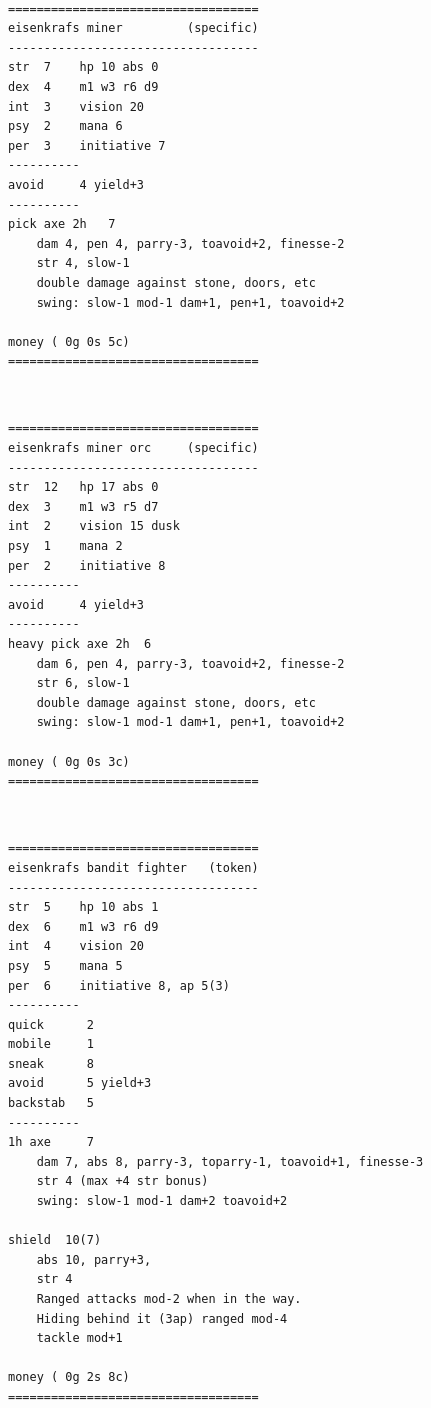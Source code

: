 \documentclass[11pt, twoside, titlepage, a4paper]{report}
\begin{document}
\

\goodbreak \begin{samepage} \small \begin{verbatim}
===================================
eisenkrafs miner         (specific)
-----------------------------------
str  7    hp 10 abs 0
dex  4    m1 w3 r6 d9
int  3    vision 20
psy  2    mana 6
per  3    initiative 7
----------
avoid     4 yield+3
----------
pick axe 2h   7
    dam 4, pen 4, parry-3, toavoid+2, finesse-2
    str 4, slow-1
    double damage against stone, doors, etc
    swing: slow-1 mod-1 dam+1, pen+1, toavoid+2

money ( 0g 0s 5c)
===================================
\end{verbatim} \normalsize \end{samepage}

\

\goodbreak \begin{samepage} \small \begin{verbatim}
===================================
eisenkrafs miner orc     (specific)
-----------------------------------
str  12   hp 17 abs 0
dex  3    m1 w3 r5 d7
int  2    vision 15 dusk
psy  1    mana 2
per  2    initiative 8
----------
avoid     4 yield+3
----------
heavy pick axe 2h  6
    dam 6, pen 4, parry-3, toavoid+2, finesse-2
    str 6, slow-1
    double damage against stone, doors, etc
    swing: slow-1 mod-1 dam+1, pen+1, toavoid+2

money ( 0g 0s 3c)
===================================
\end{verbatim} \normalsize \end{samepage}

\

\goodbreak \begin{samepage} \small \begin{verbatim}
===================================
eisenkrafs bandit fighter   (token)
-----------------------------------
str  5    hp 10 abs 1
dex  6    m1 w3 r6 d9
int  4    vision 20
psy  5    mana 5
per  6    initiative 8, ap 5(3)
----------
quick      2
mobile     1
sneak      8
avoid      5 yield+3
backstab   5
----------
1h axe     7
    dam 7, abs 8, parry-3, toparry-1, toavoid+1, finesse-3
    str 4 (max +4 str bonus)
    swing: slow-1 mod-1 dam+2 toavoid+2

shield  10(7)
    abs 10, parry+3,
    str 4
    Ranged attacks mod-2 when in the way.
    Hiding behind it (3ap) ranged mod-4
    tackle mod+1

money ( 0g 2s 8c)
===================================
\end{verbatim} \normalsize \end{samepage}
\end{document}
